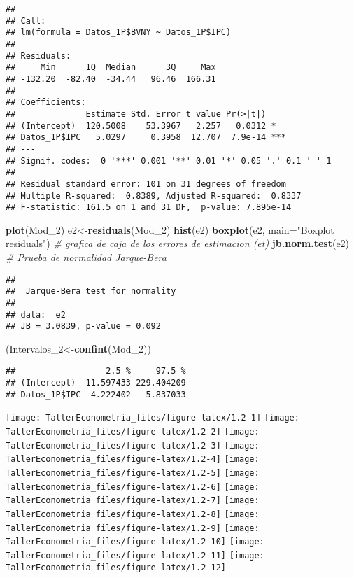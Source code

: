 \documentclass[
]{article}
\newenvironment{Shaded}{\begin{snugshade}}{\end{snugshade}}
\newcommand{\CommentTok}[1]{\textcolor[rgb]{0.56,0.35,0.01}{\textit{#1}}}
\newcommand{\DataTypeTok}[1]{\textcolor[rgb]{0.13,0.29,0.53}{#1}}
\newcommand{\DecValTok}[1]{\textcolor[rgb]{0.00,0.00,0.81}{#1}}
\newcommand{\KeywordTok}[1]{\textcolor[rgb]{0.13,0.29,0.53}{\textbf{#1}}}
\newcommand{\NormalTok}[1]{#1}
\newcommand{\StringTok}[1]{\textcolor[rgb]{0.31,0.60,0.02}{#1}}
\begin{document}
\begin{verbatim}
## 
## Call:
## lm(formula = Datos_1P$BVNY ~ Datos_1P$IPC)
## 
## Residuals:
##     Min      1Q  Median      3Q     Max 
## -132.20  -82.40  -34.44   96.46  166.31 
## 
## Coefficients:
##              Estimate Std. Error t value Pr(>|t|)    
## (Intercept)  120.5008    53.3967   2.257   0.0312 *  
## Datos_1P$IPC   5.0297     0.3958  12.707  7.9e-14 ***
## ---
## Signif. codes:  0 '***' 0.001 '**' 0.01 '*' 0.05 '.' 0.1 ' ' 1
## 
## Residual standard error: 101 on 31 degrees of freedom
## Multiple R-squared:  0.8389, Adjusted R-squared:  0.8337 
## F-statistic: 161.5 on 1 and 31 DF,  p-value: 7.895e-14
\end{verbatim}

\begin{Shaded}
\begin{Highlighting}[]
\KeywordTok{plot}\NormalTok{(Mod_}\DecValTok{2}\NormalTok{)}
\NormalTok{e2<-}\KeywordTok{residuals}\NormalTok{(Mod_}\DecValTok{2}\NormalTok{)}
\KeywordTok{hist}\NormalTok{(e2)}
\KeywordTok{boxplot}\NormalTok{(e2, }\DataTypeTok{main=}\StringTok{"Boxplot residuals"}\NormalTok{) }\CommentTok{# grafica de caja de los errores de estimacion (et)}
\KeywordTok{jb.norm.test}\NormalTok{(e2) }\CommentTok{# Prueba de normalidad Jarque-Bera }
\end{Highlighting}
\end{Shaded}

\begin{verbatim}
## 
##  Jarque-Bera test for normality
## 
## data:  e2
## JB = 3.0839, p-value = 0.092
\end{verbatim}

\begin{Shaded}
\begin{Highlighting}[]
\NormalTok{(Intervalos_}\DecValTok{2}\NormalTok{<-}\KeywordTok{confint}\NormalTok{(Mod_}\DecValTok{2}\NormalTok{))}
\end{Highlighting}
\end{Shaded}

\begin{verbatim}
##                  2.5 %     97.5 %
## (Intercept)  11.597433 229.404209
## Datos_1P$IPC  4.222402   5.837033
\end{verbatim}

\begin{center}\texttt{[image: TallerEconometria\_files/figure-latex/1.2-1]} \texttt{[image: TallerEconometria\_files/figure-latex/1.2-2]} \texttt{[image: TallerEconometria\_files/figure-latex/1.2-3]} \texttt{[image: TallerEconometria\_files/figure-latex/1.2-4]} \texttt{[image: TallerEconometria\_files/figure-latex/1.2-5]} \texttt{[image: TallerEconometria\_files/figure-latex/1.2-6]} \texttt{[image: TallerEconometria\_files/figure-latex/1.2-7]} \texttt{[image: TallerEconometria\_files/figure-latex/1.2-8]} \texttt{[image: TallerEconometria\_files/figure-latex/1.2-9]} \texttt{[image: TallerEconometria\_files/figure-latex/1.2-10]} \texttt{[image: TallerEconometria\_files/figure-latex/1.2-11]} \texttt{[image: TallerEconometria\_files/figure-latex/1.2-12]} \end{center}
\end{document}
